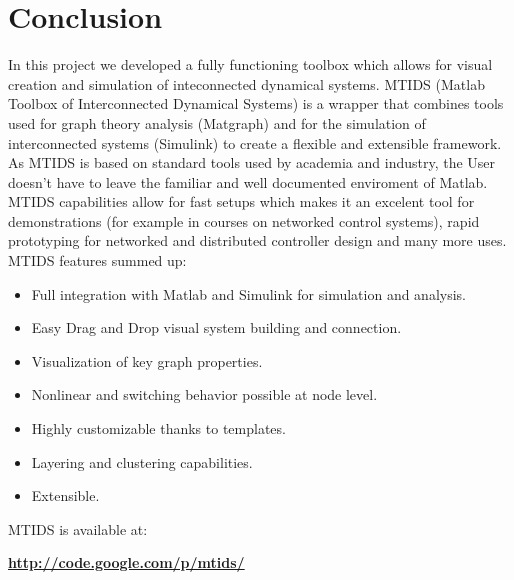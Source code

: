 \documentclass[a4paper,twoside, openright,12pt]{report}
\begin{document}
\section{Conclusion}
In this project we developed a fully functioning toolbox which allows for visual creation and simulation of inteconnected dynamical systems.
MTIDS (Matlab Toolbox of Interconnected Dynamical Systems) is a wrapper that combines tools used for graph theory analysis (Matgraph) and 
for the simulation of interconnected systems (Simulink) to create a flexible and extensible framework.
\\

As MTIDS is based on standard tools used by academia and industry, the User doesn't have to leave the familiar and well documented enviroment of Matlab.
\\ MTIDS capabilities allow for fast setups which makes it an excelent tool for demonstrations (for example in courses on networked control systems),
rapid prototyping for networked and distributed controller design and many more uses.
\linebreak
\newline  
MTIDS features summed up:
\begin{itemize}
 \item Full integration with Matlab and Simulink for simulation and analysis.
 \item Easy Drag and Drop visual system building and connection.
 \item Visualization of key graph properties. 
 \item Nonlinear and switching behavior possible at node level.
 \item Highly customizable thanks to templates.
 \item Layering and clustering capabilities.
 \item Extensible.
\end{itemize}
\smallskip 
MTIDS is available at:
\begin{center}
\textbf{ \href{http://code.google.com/p/mtids/}{http://code.google.com/p/mtids/}}
\end{center}


%


\cleardoublepage
{} 
\listoffigures 	 %

% 
 \cleardoublepage
 
 


\end{document}

